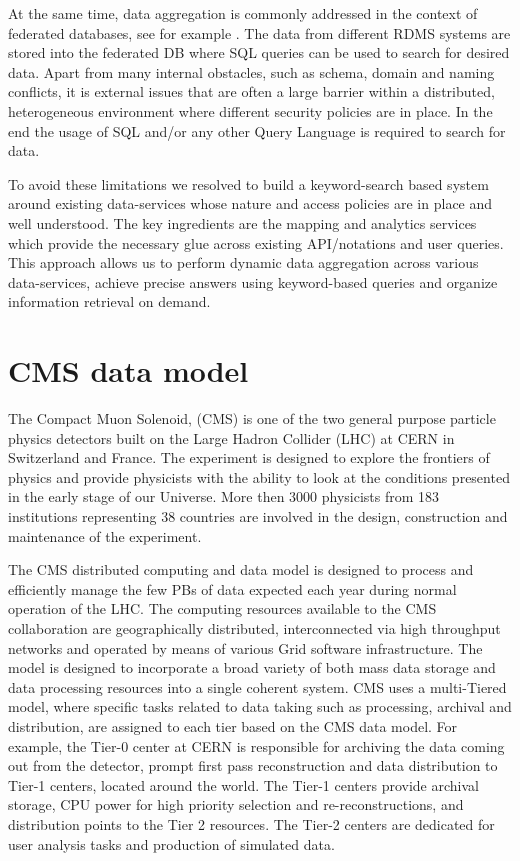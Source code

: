 \documentclass[3p,times]{elsarticle}
\begin{document}
At the same time, data aggregation is commonly addressed in the context of
federated data\-ba\-ses, see for example \cite{FedDB}. The data from different 
RDMS systems are stored into the federated DB where SQL queries can be used to 
search for desired data. Apart from many internal obstacles, such as
schema, domain and naming conflicts, it is external issues that are often
a large barrier within a distributed, heterogeneous environment where
different security policies are in place. In the end the usage of SQL and/or
any other Query Language is required to search for data.

To avoid these limitations we resolved to build a keyword-search based system around
existing data-services whose nature and access policies are in place and well understood.
The key ingredients are the mapping and analytics services which provide
the necessary glue across existing API/notations and user queries. This approach 
allows us to perform dynamic data aggregation across various data-services, achieve
precise answers using keyword-based queries
and organize information retrieval on demand.

\section{CMS data model\label{DataModel}}
The Compact Muon Solenoid, (CMS) \cite{CMS} 
is one of the two general purpose particle physics detectors built on 
the Large Hadron Collider (LHC) at CERN in Switzerland and France. 
The experiment is designed to explore the frontiers of physics and provide physicists
with the ability to look at the conditions presented in the early stage of our Universe.
More then 3000 physicists from 183 institutions representing 38 countries 
are involved in the design, construction and maintenance of the experiment.

The CMS distributed computing and data model \cite{CMSDataModel} 
is designed to process and efficiently manage the few PBs of data expected each year
during normal operation of the LHC. The computing resources available to the CMS
collaboration are geographically distributed, 
interconnected via high throughput networks and operated by means 
of various Grid software infrastructure. The model is designed to
incorporate a broad variety of both mass data storage and data processing
resources into a single coherent system. CMS uses a
multi-Tiered model, where specific tasks related to data taking such as
processing, archival and distribution, are assigned to each tier based
on the CMS data model. For example, the Tier-0 center at CERN is responsible
for archiving the data coming out from the detector, prompt first pass reconstruction
and data distribution to Tier-1 centers, located around the world.
The Tier-1 centers provide archival storage, CPU power for high
priority selection and re-reconstructions, and distribution points
to the Tier 2 resources.
The Tier-2 centers are dedicated for user analysis tasks and production of simulated data.
\end{document}
